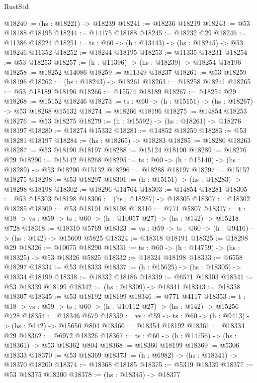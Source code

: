 \begin{lexlean}{RustStd}
\begin{coremodule}
@18240 := (hs : @18221) -> @18239
@18241 := @18236 @18219
@18243 := @53 @18188 @18195
@18244 := @14175 @18188
@18245 := @18232 @29
@18246 := @11386 @18224
@18251 := {ts : @60} -> (h : @13443) -> (hs : @18245) -> @53 @18246 @11352
@18252 := @18244 @18195
@18253 := @11335 @18231
@18254 := @53 @18253
@18257 := (h : @11396) -> (hs : @18239) -> @18254 @18196
@18258 := @18252 @14086
@18259 := @11349 @18237
@18261 := @53 @18259 @18196
@18262 := (hs : @18243) -> @18261
@18263 := @18258 @18241
@18265 := @53 @18189 @18196
@18266 := @15574 @18189
@18267 := @18254 @29
@18268 := @15152 @18246
@18273 := {ts : @60} -> (h : @15151) -> (hs : @18267) -> @53 @18268 @15132
@18274 := @18266 @18196
@18275 := @14854 @18253
@18276 := @53 @18275
@18279 := (h : @15592) -> (hs : @18261) -> @18276 @18197
@18280 := @18274 @15332
@18281 := @14852 @18259
@18283 := @53 @18281 @18197
@18284 := (hs : @18265) -> @18283
@18285 := @18280 @18263
@18287 := @53 @18190 @18197
@18288 := @15124 @18190
@18289 := @18276 @29
@18290 := @15142 @18268
@18295 := {ts : @60} -> (h : @15140) -> (hs : @18289) -> @53 @18290 @15132
@18296 := @18288 @18197
@18297 := @15152 @18275
@18298 := @53 @18297
@18301 := (h : @15151) -> (hs : @18283) -> @18298 @18198
@18302 := @18296 @14764
@18303 := @14854 @18281
@18305 := @53 @18303 @18198
@18306 := (hs : @18287) -> @18305
@18307 := @18302 @18285
@18309 := @53 @18191 @18198
@18310 := @771 @5807
@18317 := {t : @18} -> {vs : @59} -> {ts : @60} -> (h : @10057 @27) -> (hs : @142) -> @15218 @728
@18318 := @18310 @5769
@18323 := {vs : @59} -> {ts : @60} -> (h : @9416) -> (hs : @142) -> @15609 @5825
@18324 := @18318 @18191
@18325 := @18298 @29
@18326 := @10075 @18290
@18331 := {ts : @60} -> (h : @14759) -> (hs : @18325) -> @53 @18326 @5825
@18332 := @18324 @18198
@18333 := @6558 @18297
@18334 := @53 @18333
@18337 := (h : @15625) -> (hs : @18305) -> @18334 @18199
@18338 := @18332 @18186
@18339 := @6571 @18303
@18341 := @53 @18339 @18199
@18342 := (hs : @18309) -> @18341
@18343 := @18338 @18307
@18345 := @53 @18192 @18199
@18346 := @771 @4117
@18353 := {t : @18} -> {vs : @59} -> {ts : @60} -> (h : @10112 @27) -> (hs : @142) -> @15256 @728
@18354 := @18346 @679
@18359 := {vs : @59} -> {ts : @60} -> (h : @9413) -> (hs : @142) -> @15650 @804
@18360 := @18354 @18192
@18361 := @18334 @29
@18362 := @6972 @18326
@18367 := {ts : @60} -> (h : @14756) -> (hs : @18361) -> @53 @18362 @804
@18368 := @18360 @18199
@18369 := @5306 @18333
@18370 := @53 @18369
@18373 := (h : @6982) -> (hs : @18341) -> @18370 @18200
@18374 := @18368 @18185
@18375 := @5319 @18339
@18377 := @53 @18375 @18200
@18378 := (hs : @18345) -> @18377

\end{coremodule}
\end{lexlean}
